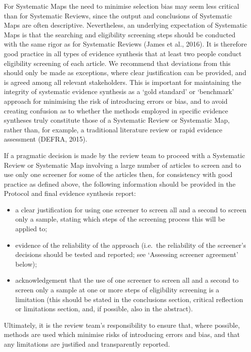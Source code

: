 \documentclass[
  letterpaper,
  DIV=11,
  numbers=noendperiod]{scrreprt}
\begin{document}
For Systematic Maps the need to minimise selection bias may seem less
critical than for Systematic Reviews, since the output and conclusions
of Systematic Maps are often descriptive. Nevertheless, an underlying
expectation of Systematic Maps is that the searching and eligibility
screening steps should be conducted with the same rigor as for
Systematic Reviews (James et al., 2016). It is therefore good practice
in all types of evidence synthesis that at least two people conduct
eligibility screening of each article. We recommend that deviations from
this should only be made as exceptions, where clear justification can be
provided, and is agreed among all relevant stakeholders. This is
important for maintaining the integrity of systematic evidence synthesis
as a `gold standard' or `benchmark' approach for minimising the risk of
introducing errors or bias, and to avoid creating confusion as to
whether the methods employed in specific evidence syntheses truly
constitute those of a Systematic Review or Systematic Map, rather than,
for example, a traditional literature review or rapid evidence
assessment (DEFRA, 2015).

If a pragmatic decision is made by the review team to proceed with a
Systematic Review or Systematic Map involving a large number of articles
to screen and to use only one screener for some of the articles then,
for consistency with good practice as defined above, the following
information should be provided in the Protocol and final evidence
synthesis report:

\begin{itemize}
\item
  a clear justification for using one screener to screen all and a
  second to screen only a sample, stating which steps of the screening
  process this will be applied to;
\item
  evidence of the reliability of the approach (i.e.~the reliability of
  the screener's decisions should be tested and reported; see `Assessing
  screener agreement' below);
\item
  acknowledgement that the use of one screener to screen all and a
  second to screen only a sample at one or more steps of eligibility
  screening is a limitation (this should be stated in the conclusions
  section, critical reflection or limitations section, and, if possible,
  also in the abstract).
\end{itemize}

Ultimately, it is the review team's responsibility to ensure that, where
possible, methods are used which minimise risks of introducing errors
and bias, and that any limitations are justified and transparently
reported.
\end{document}
